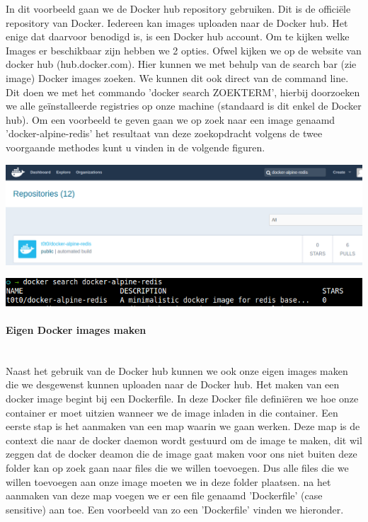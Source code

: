 In dit voorbeeld gaan we de Docker hub repository gebruiken. Dit is de officiële repository van Docker. Iedereen kan images uploaden naar de Docker hub. Het enige dat daarvoor benodigd is, is een Docker hub account. Om te kijken welke Images er beschikbaar zijn hebben we 2 opties. Ofwel kijken we op de website van docker hub (hub.docker.com). Hier kunnen we met behulp van de search bar (zie image) Docker images zoeken. We kunnen dit ook direct van de command line. Dit doen we met het commando 'docker search ZOEKTERM', hierbij doorzoeken we alle geïnstalleerde registries op onze machine (standaard is dit enkel de Docker hub). Om een voorbeeld te geven gaan we op zoek naar een image genaamd 'docker-alpine-redis' het resultaat van deze zoekopdracht volgens de twee voorgaande methodes kunt u vinden in de volgende figuren.

\includegraphics[scale=0.315]{img/dockerSearchSite.png}


\includegraphics[scale=0.55]{img/dockerSearchCommand.png}


\paragraph{Eigen Docker images maken}~\\

Naast het gebruik van de Docker hub kunnen we ook onze eigen images maken die we desgewenst kunnen uploaden naar de Docker hub. Het maken van een docker image begint bij een Dockerfile. In deze Docker file definiëren we hoe onze container er moet uitzien wanneer we de image inladen in die container. Een eerste stap is het aanmaken van een map waarin we gaan werken. Deze map is de context die naar de docker daemon wordt gestuurd om de image te maken, dit wil zeggen dat de docker deamon die de image gaat maken voor ons niet buiten deze folder kan op zoek gaan naar files die we willen toevoegen. Dus alle files die we willen toevoegen aan onze image moeten we in deze folder plaatsen. na het aanmaken van deze map voegen we er een file genaamd 'Dockerfile' (case sensitive) aan toe. Een voorbeeld van zo een 'Dockerfile' vinden we hieronder. 

